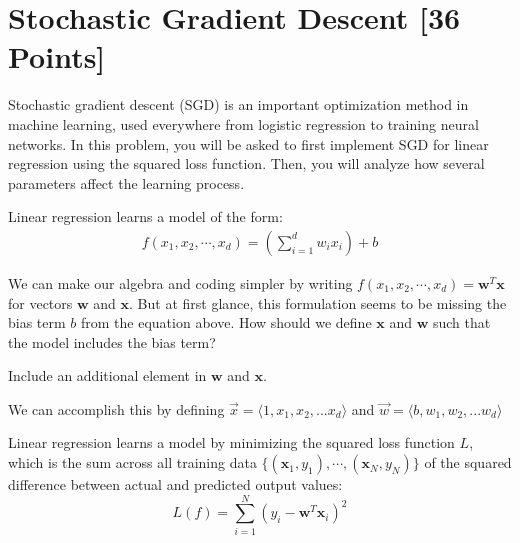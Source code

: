 
\newpage
\section{Stochastic Gradient Descent [36 Points]}

Stochastic gradient descent (SGD) is an important optimization method in machine learning, used everywhere from logistic regression to training neural networks. In this problem, you will be asked to first implement SGD for linear regression using the squared loss function. Then, you will analyze how several parameters affect the learning process.

Linear regression learns a model of the form:
\begin{align*}
  f(x_1, x_2, \cdots, x_d) = \left(\sum_{i=1}^d w_i x_i\right) + b
\end{align*}

\begin{problem}[2]
  We can make our algebra and coding simpler by writing $f(x_1, x_2, \cdots, x_d) = \mathbf{w}^T\mathbf{x}$ for vectors $\mathbf{w}$ and $\mathbf{x}$.  But at first glance, this formulation seems to be missing the bias term $b$ from the equation above.  How should we define $\mathbf{x}$ and $\mathbf{w}$ such that the model includes the bias term?
\end{problem}
\begin{hint}
  Include an additional element in $\mathbf{w}$ and $\mathbf{x}$.
\end{hint}
\begin{solution}
  We can accomplish this by defining $\vec x = \langle 1, x_1, x_2, ... x_d \rangle$ and $\vec w = \langle b, w_1, w_2, ... w_d \rangle$
\end{solution}

Linear regression learns a model by minimizing the squared loss function $L$, which is the sum across all training data $\{(\mathbf{x}_1, y_1),\cdots,(\mathbf{x}_N, y_N)\}$ of the squared difference between actual and predicted output values:
\[L(f) = \sum_{i=1}^N (y_i - \mathbf{w}^T\mathbf{x}_i)^2\]

